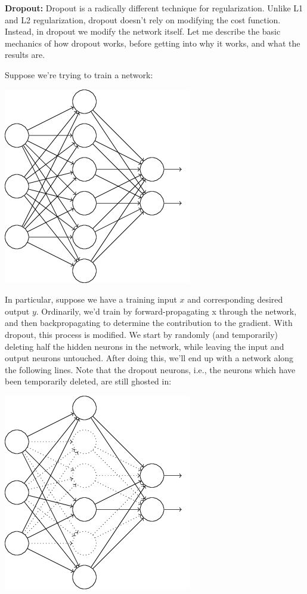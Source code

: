 \documentclass[a4paper,twoside,10pt]{book}
\begin{document}
\textbf{Dropout:} Dropout is a radically different technique for regularization. Unlike L1 and L2 regularization, dropout doesn't rely on modifying the cost function. Instead, in dropout we modify the network itself. Let me describe the basic mechanics of how dropout works, before getting into why it works, and what the results are.

Suppose we're trying to train a network:
\begin{center}
	\includegraphics[width=0.7\linewidth]{figures/ch3/tikz30}
\end{center}
In particular, suppose we have a training input $x$ and corresponding desired output $y$. Ordinarily, we'd train by forward-propagating x through the network, and then backpropagating to determine the contribution to the gradient. With dropout, this process is modified. We start by randomly (and temporarily) deleting half the hidden neurons in the network, while leaving the input and output neurons untouched. After doing this, we'll end up with a network along the following lines. Note that the dropout neurons, i.e., the neurons which have been temporarily deleted, are still ghosted in:
\begin{center}
	\includegraphics[width=0.7\linewidth]{figures/ch3/tikz31}
\end{center}
\end{document}
